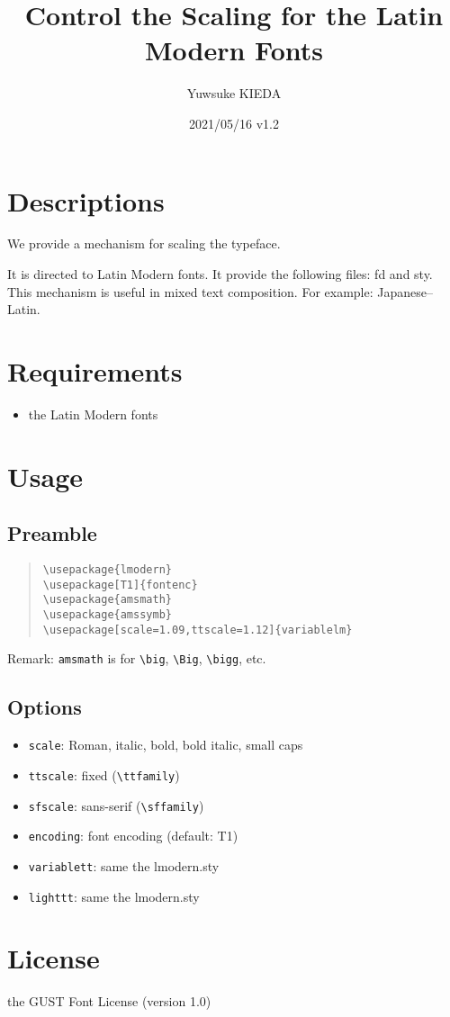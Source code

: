 \documentclass{article}
\title{Control the Scaling for the Latin Modern Fonts}
\author{Yuwsuke KIEDA}
\date{2021/05/16 v1.2}
\begin{document}
\maketitle

\section{Descriptions}

We provide a mechanism for scaling the typeface.

It is directed to Latin Modern fonts.
It provide the following files: fd and sty.
This mechanism is useful in mixed text composition.
For example: Japanese--Latin.

\section{Requirements}

\begin{itemize}
 \item the Latin Modern fonts
\end{itemize}

\section{Usage}

\subsection{Preamble}

\begin{quote}
\begin{verbatim}
\usepackage{lmodern}
\usepackage[T1]{fontenc}
\usepackage{amsmath}
\usepackage{amssymb}
\usepackage[scale=1.09,ttscale=1.12]{variablelm}
\end{verbatim}
\end{quote}

Remark: \texttt{amsmath} is for \verb!\big!, \verb!\Big!, \verb!\bigg!, etc.

\subsection{Options}

\begin{itemize}
 \item [\textendash] \texttt{scale}: Roman, italic, bold, bold italic, small caps
 \item [\textendash] \texttt{ttscale}: fixed (\verb!\ttfamily!)
 \item [\textendash] \texttt{sfscale}: sans-serif (\verb!\sffamily!)
 \item [\textendash] \texttt{encoding}: font encoding (default: T1)
 \item [\textendash] \texttt{variablett}: same the lmodern.sty
 \item [\textendash] \texttt{lighttt}: same the lmodern.sty
\end{itemize}


\section{License}

the GUST Font License (version 1.0)
\end{document}
